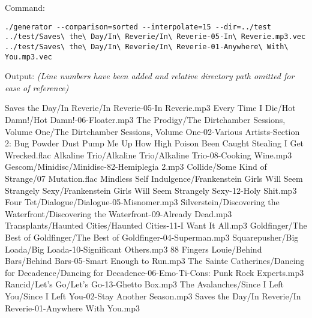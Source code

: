 Command:
\begin{verbatim}
./generator --comparison=sorted --interpolate=15 --dir=../test ../test/Saves\ the\ Day/In\ Reverie/In\ Reverie-05-In\ Reverie.mp3.vec ../test/Saves\ the\ Day/In\ Reverie/In\ Reverie-01-Anywhere\ With\ You.mp3.vec
\end{verbatim}
Output: \small \emph{(Line numbers have been added and relative directory path omitted for ease of reference)}
\begin{listing}{1}
Saves the Day/In Reverie/In Reverie-05-In Reverie.mp3
Every Time I Die/Hot Damn!/Hot Damn!-06-Floater.mp3
The Prodigy/The Dirtchamber Sessions, Volume One/The Dirtchamber Sessions, Volume One-02-Various Artists-Section 2: Bug Powder Dust  Pump Me Up  How High  Poison  Been Caught Stealing  I Get Wrecked.flac
Alkaline Trio/Alkaline Trio/Alkaline Trio-08-Cooking Wine.mp3
Gescom/Minidisc/Minidisc-82-Hemiplegia 2.mp3
Collide/Some Kind of Strange/07 Mutation.flac
Mindless Self Indulgence/Frankenstein Girls Will Seem Strangely Sexy/Frankenstein Girls Will Seem Strangely Sexy-12-Holy Shit.mp3
Four Tet/Dialogue/Dialogue-05-Misnomer.mp3
Silverstein/Discovering the Waterfront/Discovering the Waterfront-09-Already Dead.mp3
Transplants/Haunted Cities/Haunted Cities-11-I Want It All.mp3
Goldfinger/The Best of Goldfinger/The Best of Goldfinger-04-Superman.mp3
Squarepusher/Big Loada/Big Loada-10-Significant Others.mp3
88 Fingers Louie/Behind Bars/Behind Bars-05-Smart Enough to Run.mp3
The Sainte Catherines/Dancing for Decadence/Dancing for Decadence-06-Emo-Ti-Cons: Punk Rock Experts.mp3
Rancid/Let's Go/Let's Go-13-Ghetto Box.mp3
The Avalanches/Since I Left You/Since I Left You-02-Stay Another Season.mp3
Saves the Day/In Reverie/In Reverie-01-Anywhere With You.mp3
\end{listing}

